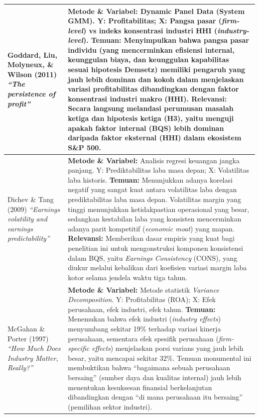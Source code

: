 \documentclass[12pt,a4paper]{article}
\begin{document}
\begin{longtable}{>{\raggedright\arraybackslash}p{} >{\raggedright\arraybackslash}p{}}
\midrule
Goddard, Liu, Molyneux, \& Wilson (2011) \newline \textit{``The persistence of profit''} &
\textbf{Metode \& Variabel:} Dynamic Panel Data (System GMM). Y: Profitabilitas; X: Pangsa pasar (\textit{firm-level}) vs indeks konsentrasi industri HHI (\textit{industry-level}). \newline
\textbf{Temuan:} Menyimpulkan bahwa pangsa pasar individu (yang mencerminkan efisiensi internal, keunggulan biaya, dan keunggulan kapabilitas sesuai hipotesis Demsetz) memiliki pengaruh yang jauh lebih dominan dan kokoh dalam menjelaskan variasi profitabilitas dibandingkan dengan faktor konsentrasi industri makro (HHI). \newline
\textbf{Relevansi:} Secara langsung melandasi perumusan masalah ketiga dan hipotesis ketiga (H3), yaitu menguji apakah faktor internal (BQS) lebih dominan daripada faktor eksternal (HHI) dalam ekosistem S\&P 500. \\
\midrule
Dichev \& Tang (2009) \newline \textit{``Earnings volatility and earnings predictability''} &
\textbf{Metode \& Variabel:} Analisis regresi keuangan jangka panjang. Y: Prediktabilitas laba masa depan; X: Volatilitas laba historis. \newline
\textbf{Temuan:} Menunjukkan adanya korelasi negatif yang sangat kuat antara volatilitas laba dengan prediktabilitas laba masa depan. Volatilitas margin yang tinggi menunjukkan ketidakpastian operasional yang besar, sedangkan kestabilan laba yang konsisten mencerminkan adanya parit kompetitif (\textit{economic moat}) yang mapan. \newline
\textbf{Relevansi:} Memberikan dasar empiris yang kuat bagi penelitian ini untuk mengonstruksi komponen konsistensi dalam BQS, yaitu \textit{Earnings Consistency} (CONS), yang diukur melalui kebalikan dari koefisien variasi margin laba kotor selama jendela waktu tiga tahun. \\
\midrule
McGahan \& Porter (1997) \newline \textit{``How Much Does Industry Matter, Really?''} &
\textbf{Metode \& Variabel:} Metode statistik \textit{Variance Decomposition}. Y: Profitabilitas (ROA); X: Efek perusahaan, efek industri, efek tahun. \newline
\textbf{Temuan:} Menemukan bahwa efek industri (\textit{industry effects}) menyumbang sekitar 19\% terhadap variasi kinerja perusahaan, sementara efek spesifik perusahaan (\textit{firm-specific effects}) menjelaskan porsi varians yang jauh lebih besar, yaitu mencapai sekitar 32\%. Temuan monumental ini membuktikan bahwa ``bagaimana sebuah perusahaan bersaing'' (sumber daya dan kualitas internal) jauh lebih menentukan kesuksesan finansial berkelanjutan dibandingkan dengan ``di mana perusahaan itu bersaing'' (pemilihan sektor industri). \newline

\end{longtable}
\end{document}
